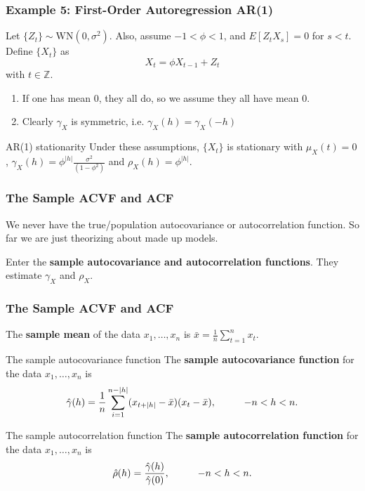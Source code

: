 \documentclass{beamer}
\begin{document}

\begin{frame}
\frametitle{Example 5: First-Order Autoregression AR(1) }

Let $\{Z_t\} \sim \text{WN}(0, \sigma^2)$. Also, assume $-1 < \phi < 1$, and $E[Z_tX_s] = 0$ for $s < t$. Define $\{X_t\}$ as
\[
X_t = \phi X_{t-1} + Z_t \tag{*}
\]
with $t \in \mathbb{Z}$. 

\begin{enumerate}
\item If one has mean $0$, they all do, so we assume they all have mean $0$. 
\item Clearly $\gamma_X$ is symmetric, i.e. $\gamma_X(h) = \gamma_X(-h)$
\end{enumerate}

\begin{block}{AR(1) stationarity}
Under these assumptions, $\{X_t\}$ is stationary with $\mu_X(t) = 0$, $\gamma_X(h) = \phi^{|h|}\frac{\sigma^2}{(1-\phi^2)}$ and $\rho_X(h) = \phi^{|h|}$.
\end{block}

\end{frame}


\begin{frame}
\frametitle{The Sample ACVF and ACF}

We never have the true/population autocovariance or autocorrelation function. So far we are just theorizing about made up models.
\newline

Enter the {\bf sample autocovariance and autocorrelation functions}. They estimate $\gamma_X$ and $\rho_X$.
\newline

\end{frame}


\begin{frame}
\frametitle{The Sample ACVF and ACF}

The {\bf sample mean} of the data $x_1, \ldots, x_n$ is $\bar{x} = \frac{1}{n}\sum_{t=1}^n x_t.$

\begin{block}{The sample autocovariance function}
The {\bf sample autocovariance function} for the data $x_1, \ldots, x_n$ is
\[
\hat{\gamma}(h) = \frac{1}{n}\sum_{i=1}^{n-|h|}(x_{t+|h|}-\bar{x})(x_t - \bar{x}), \hspace{10mm} -n < h < n.
\]
\end{block}

\begin{block}{The sample autocorrelation function}
The {\bf sample autocorrelation function} for the data $x_1, \ldots, x_n$ is
\[
\hat{\rho}(h) = \frac{\hat{\gamma}(h)}{\hat{\gamma}(0)}, \hspace{10mm} -n < h < n.
\]
\end{block}

\end{frame}
\end{document}
